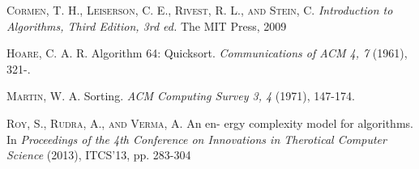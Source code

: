 \documentclass[a4paper, 10pt,twocolumn]{article}
\begin{document}
\begin{thebibliography}{25}
\textsc{Cormen, T. H., Leiserson, C. E., Rivest, R. L., and Stein, C. } \textit{Introduction to Algorithms, Third Edition, 3rd ed.}
The MIT Press, 2009

\textsc{Hoare, C. A. R.} Algorithm 64: Quicksort.
\textit{Communications of ACM 4, 7} (1961), 321-.

\textsc{Martin, W. A.} Sorting.
\textit{ACM Computing Survey 3, 4} (1971), 147-174.


\textsc{Roy, S., Rudra, A., and Verma, A.} An en-
ergy complexity model for algorithms. In 
\textit{Proceedings of the 4th Conference on Innovations in Therotical Computer Science} (2013), ITCS'13, pp. 283-304

\end{thebibliography}
\end{document}
